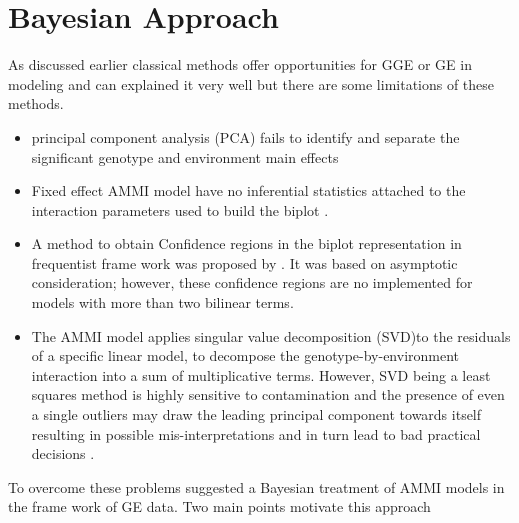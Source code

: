 \section{Bayesian Approach}
As discussed earlier classical methods offer opportunities for GGE or GE in modeling and can explained it very well but there are some limitations of these methods. 
\begin{itemize}
\item principal component analysis (PCA) fails to identify and separate the significant genotype and environment main effects \citep{Zobel1988}
\item Fixed effect AMMI model have no inferential statistics attached to the interaction parameters  used to build the biplot \citep{Yang2009}.
\item A method to obtain Confidence regions in the biplot representation in frequentist frame work was proposed by \citep{Denis1996}. It was based on asymptotic consideration; however, these confidence regions are no implemented  for models with more than two bilinear terms.
\item The AMMI model applies singular value decomposition (SVD)to the residuals of a specific linear model, to decompose the genotype-by-environment interaction into a sum of multiplicative terms. However, SVD being a least squares method is highly sensitive to contamination and the presence of even a single outliers may draw the leading principal component towards itself resulting in possible mis-interpretations and in turn lead to bad practical decisions \citep{Rodrigues2015}.
\end{itemize}
To overcome these problems \citep{PEREZ-ELIZALDE2011} suggested a Bayesian treatment of AMMI models in the frame work of GE data. Two main points motivate this approach
